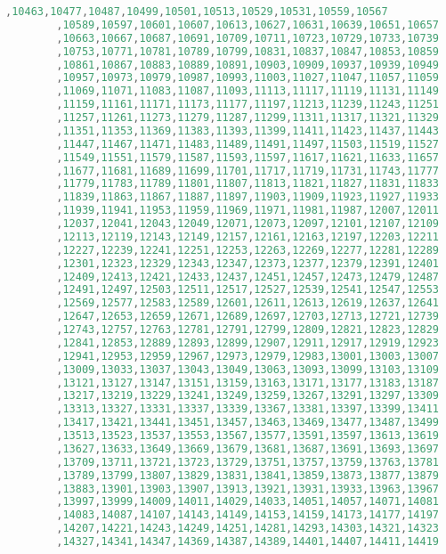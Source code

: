 \begin{solution}
\begin{lstlisting}[language=Java, caption="Java"]
		,10463,10477,10487,10499,10501,10513,10529,10531,10559,10567 
		,10589,10597,10601,10607,10613,10627,10631,10639,10651,10657 
		,10663,10667,10687,10691,10709,10711,10723,10729,10733,10739 
		,10753,10771,10781,10789,10799,10831,10837,10847,10853,10859 
		,10861,10867,10883,10889,10891,10903,10909,10937,10939,10949 
		,10957,10973,10979,10987,10993,11003,11027,11047,11057,11059 
		,11069,11071,11083,11087,11093,11113,11117,11119,11131,11149 
		,11159,11161,11171,11173,11177,11197,11213,11239,11243,11251 
		,11257,11261,11273,11279,11287,11299,11311,11317,11321,11329 
		,11351,11353,11369,11383,11393,11399,11411,11423,11437,11443 
		,11447,11467,11471,11483,11489,11491,11497,11503,11519,11527 
		,11549,11551,11579,11587,11593,11597,11617,11621,11633,11657 
		,11677,11681,11689,11699,11701,11717,11719,11731,11743,11777 
		,11779,11783,11789,11801,11807,11813,11821,11827,11831,11833 
		,11839,11863,11867,11887,11897,11903,11909,11923,11927,11933 
		,11939,11941,11953,11959,11969,11971,11981,11987,12007,12011 
		,12037,12041,12043,12049,12071,12073,12097,12101,12107,12109 
		,12113,12119,12143,12149,12157,12161,12163,12197,12203,12211 
		,12227,12239,12241,12251,12253,12263,12269,12277,12281,12289 
		,12301,12323,12329,12343,12347,12373,12377,12379,12391,12401 
		,12409,12413,12421,12433,12437,12451,12457,12473,12479,12487 
		,12491,12497,12503,12511,12517,12527,12539,12541,12547,12553 
		,12569,12577,12583,12589,12601,12611,12613,12619,12637,12641 
		,12647,12653,12659,12671,12689,12697,12703,12713,12721,12739 
		,12743,12757,12763,12781,12791,12799,12809,12821,12823,12829 
		,12841,12853,12889,12893,12899,12907,12911,12917,12919,12923 
		,12941,12953,12959,12967,12973,12979,12983,13001,13003,13007 
		,13009,13033,13037,13043,13049,13063,13093,13099,13103,13109 
		,13121,13127,13147,13151,13159,13163,13171,13177,13183,13187 
		,13217,13219,13229,13241,13249,13259,13267,13291,13297,13309 
		,13313,13327,13331,13337,13339,13367,13381,13397,13399,13411 
		,13417,13421,13441,13451,13457,13463,13469,13477,13487,13499 
		,13513,13523,13537,13553,13567,13577,13591,13597,13613,13619 
		,13627,13633,13649,13669,13679,13681,13687,13691,13693,13697 
		,13709,13711,13721,13723,13729,13751,13757,13759,13763,13781 
		,13789,13799,13807,13829,13831,13841,13859,13873,13877,13879 
		,13883,13901,13903,13907,13913,13921,13931,13933,13963,13967 
		,13997,13999,14009,14011,14029,14033,14051,14057,14071,14081 
		,14083,14087,14107,14143,14149,14153,14159,14173,14177,14197 
		,14207,14221,14243,14249,14251,14281,14293,14303,14321,14323 
		,14327,14341,14347,14369,14387,14389,14401,14407,14411,14419 

\end{lstlisting}
\end{solution}
